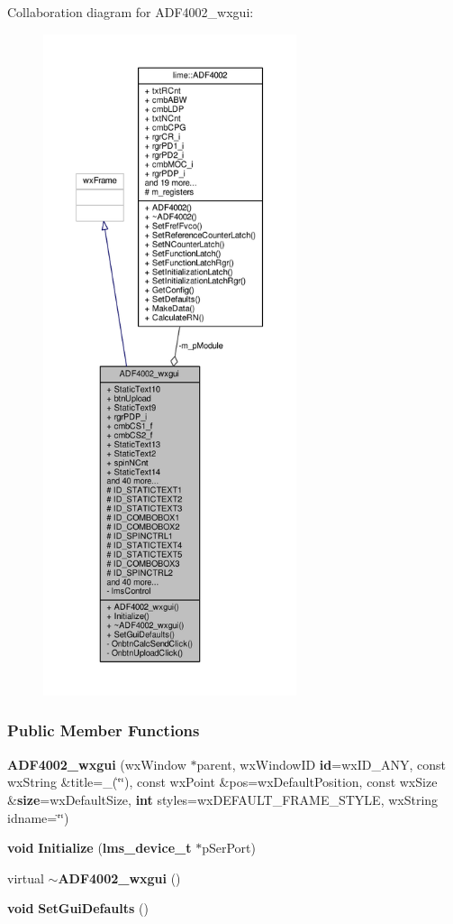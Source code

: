 Collaboration diagram for A\+D\+F4002\+\_\+wxgui\+:
\nopagebreak
\begin{figure}[H]
\begin{center}
\leavevmode
\includegraphics[height=550pt]{d8/d7f/classADF4002__wxgui__coll__graph}
\end{center}
\end{figure}
\subsubsection*{Public Member Functions}
\begin{DoxyCompactItemize}
\item 
{\bf A\+D\+F4002\+\_\+wxgui} (wx\+Window $\ast$parent, wx\+Window\+ID {\bf id}=wx\+I\+D\+\_\+\+A\+NY, const wx\+String \&title=\+\_\+(\char`\"{}\char`\"{}), const wx\+Point \&pos=wx\+Default\+Position, const wx\+Size \&{\bf size}=wx\+Default\+Size, {\bf int} styles=wx\+D\+E\+F\+A\+U\+L\+T\+\_\+\+F\+R\+A\+M\+E\+\_\+\+S\+T\+Y\+LE, wx\+String idname=\char`\"{}\char`\"{})
\item 
{\bf void} {\bf Initialize} ({\bf lms\+\_\+device\+\_\+t} $\ast$p\+Ser\+Port)
\item 
virtual {\bf $\sim$\+A\+D\+F4002\+\_\+wxgui} ()
\item 
{\bf void} {\bf Set\+Gui\+Defaults} ()
\end{DoxyCompactItemize}
